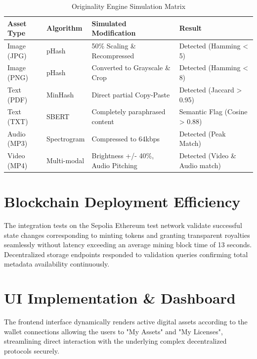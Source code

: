 \documentclass[12pt,a4paper]{report}
\begin{document}
\begin{table}[H]
    \centering
    \caption{Originality Engine Simulation Matrix}
    \begin{tabular}{|l|l|p{5cm}|l|}
        \hline
        \textbf{Asset Type} & \textbf{Algorithm} & \textbf{Simulated Modification} & \textbf{Result} \\
        \hline
        Image (JPG) & pHash & 50\% Scaling \& Recompressed & Detected (Hamming < 5) \\
        \hline
        Image (PNG) & pHash & Converted to Grayscale \& Crop & Detected (Hamming < 8) \\
        \hline
        Text (PDF) & MinHash & Direct partial Copy-Paste & Detected (Jaccard > 0.95) \\
        \hline
        Text (TXT) & SBERT & Completely paraphrased content & Semantic Flag (Cosine > 0.88) \\
        \hline
        Audio (MP3) & Spectrogram & Compressed to 64kbps & Detected (Peak Match) \\
        \hline
        Video (MP4) & Multi-modal & Brightness +/- 40\%, Audio Pitching & Detected (Video \& Audio match) \\
        \hline
    \end{tabular}
\end{table}

\section{Blockchain Deployment Efficiency}
The integration tests on the Sepolia Ethereum test network validate successful state changes corresponding to minting tokens and granting transparent royalties seamlessly without latency exceeding an average mining block time of 13 seconds. Decentralized storage endpoints responded to validation queries confirming total metadata availability continuously.

\section{UI Implementation \& Dashboard}
The frontend interface dynamically renders active digital assets according to the wallet connections allowing the users to "My Assets" and "My Licenses", streamlining direct interaction with the underlying complex decentralized protocols securely.

\end{document}
